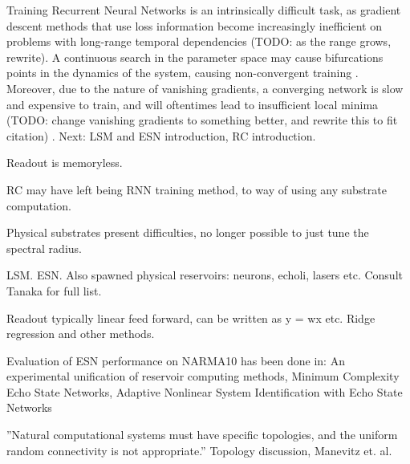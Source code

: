 Training Recurrent Neural Networks is an intrinsically difficult task, as
gradient descent methods that use loss information become increasingly
inefficient on problems with long-range temporal dependencies (TODO: as the
range grows, rewrite).  A continuous search in the parameter space may cause
bifurcations points in the dynamics of the system, causing non-convergent
training \cite{doya_bifurcations_nodate}. Moreover, due to the nature of
vanishing gradients, a converging network is slow and expensive to train, and
will oftentimes lead to insufficient local minima (TODO: change vanishing
gradients to something better, and rewrite this to fit citation)
\cite{bengio_learning_1994}. Next: LSM and ESN introduction, RC introduction.

Readout is memoryless.

RC may have left being RNN training method, to way of using any substrate
computation.

Physical substrates present difficulties, no longer possible to just tune the
spectral radius.

LSM. ESN. Also spawned physical reservoirs: neurons, echoli, lasers etc. Consult
Tanaka for full list.

Readout typically linear feed forward, can be written as y = wx etc. Ridge
regression and other methods.

Evaluation of ESN performance on NARMA10 has been done in: An experimental unification of reservoir computing methods, Minimum Complexity Echo State Networks, Adaptive Nonlinear System Identification with Echo State Networks

''Natural computational systems must have specific topologies, and the uniform
random connectivity is not appropriate.'' Topology discussion, Manevitz et. al.

